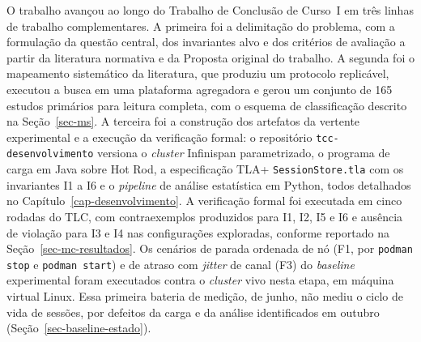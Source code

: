 
\label{sec-sintese}

O trabalho avançou ao longo do Trabalho de Conclusão de Curso~I em três linhas de trabalho complementares. A primeira foi a delimitação do problema, com a formulação da questão central, dos invariantes alvo e dos critérios de avaliação a partir da literatura normativa e da Proposta original do trabalho. A segunda foi o mapeamento sistemático da literatura, que produziu um protocolo replicável, executou a busca em uma plataforma agregadora e gerou um conjunto de 165 estudos primários para leitura completa, com o esquema de classificação descrito na Seção~\ref{sec-ms}. A terceira foi a construção dos artefatos da vertente experimental e a execução da verificação formal: o repositório \texttt{tcc-desenvolvimento} versiona o \emph{cluster} Infinispan parametrizado, o programa de carga em Java sobre Hot Rod, a especificação TLA+ \texttt{SessionStore.tla} com os invariantes I1 a I6 e o \emph{pipeline} de análise estatística em Python, todos detalhados no Capítulo~\ref{cap-desenvolvimento}. A verificação formal foi executada em cinco rodadas do TLC, com contraexemplos produzidos para I1, I2, I5 e I6 e ausência de violação para I3 e I4 nas configurações exploradas, conforme reportado na Seção~\ref{sec-mc-resultados}. Os cenários de parada ordenada de nó (F1, por \texttt{podman stop} e \texttt{podman start}) e de atraso com \emph{jitter} de canal (F3) do \emph{baseline} experimental foram executados contra o \emph{cluster} vivo nesta etapa, em máquina virtual Linux. Essa primeira bateria de medição, de junho, não mediu o ciclo de vida de sessões, por defeitos da carga e da análise identificados em outubro (Seção~\ref{sec-baseline-estado}).

